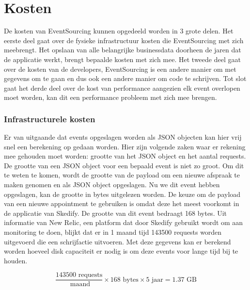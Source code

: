 
\chapter{Kosten}
\label{ch:kosten}

De kosten van EventSourcing kunnen opgedeeld worden in 3 grote delen. Het eerste deel gaat over de fysieke infrastructuur kosten die EventSourcing met zich meebrengt. Het opslaan van alle belangrijke businessdata doorheen de jaren dat de applicatie werkt, brengt bepaalde kosten met zich mee. Het tweede deel gaat over de kosten van de developers, EventSourcing is een andere manier om met gegevens om te gaan en dus ook een andere manier om code te schrijven. Tot slot gaat het derde deel over de kost van performance aangezien elk event overlopen moet worden, kan dit een performance probleem met zich mee brengen.

\subsection{Infrastructurele kosten}
\label{subsec:infrastructurele-kosten}

Er van uitgaande dat events opgeslagen worden als \gls{JSON} objecten kan hier vrij snel een berekening op gedaan worden. Hier zijn volgende zaken waar er rekening mee gehouden moet worden: grootte van het \gls{JSON} object en het aantal requests.
De grootte van een \gls{JSON} object voor een bepaald event is niet zo groot. Om dit te weten te komen, wordt de grootte van de \gls{payload} om een nieuwe afspraak te maken genomen en als \gls{JSON} object opgeslagen. Nu we dit event hebben opgeslagen, kan de grootte in bytes uitgelezen worden. De keuze om de payload van een nieuwe appointment te gebruiken is omdat deze het meest voorkomt in de applicatie van Skedify. De grootte van dit event bedraagt 168 bytes.
Uit informatie van New Relic, een platform dat door Skedify gebruikt wordt om aan monitoring te doen, blijkt dat er in 1 maand tijd 143500 requests worden uitgevoerd die een schrijfactie uitvoeren.
Met deze gegevens kan er berekend worden hoeveel disk capaciteit er nodig is om deze events voor lange tijd bij te houden.

\begin{equation}
\frac{143 500 \text{ requests}}{\text{ maand}} \times 168 \text{ bytes} \times 5 \text{ jaar} = 1.37 \text{ GB} 
\end{equation}

